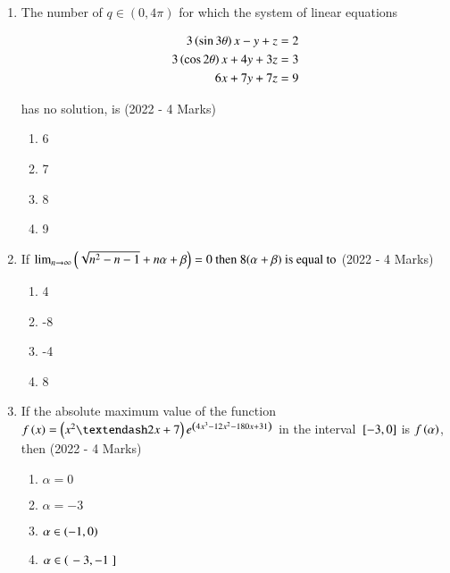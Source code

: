 \documentclass[journal]{IEEEtran}
\begin{document}
\begin{enumerate}
{        }
    \item{
     
            The number of $q \in (0, 4\pi)$ for which the system of linear equations
            
            \begin{align*}
            	3\left(\sin 3\theta\right) x - y + z &= 2 \\
            	3\left(\cos 2\theta\right) x + 4y + 3z &= 3 \\
            	6x + 7y + 7z &= 9
            \end{align*}
            
            has no solution, is \text{ }
            \hfill
            {(2022 - 4 Marks)}
            \begin{multicols}{4}
                \begin{enumerate}
                	\item 6
                	\item 7
                	\item 8
                	\item 9
                \end{enumerate}
            \end{multicols}
        
        }
    \item{
            If  $\lim_{n\rightarrow\infty}\left(\sqrt{n^2-n-1}+n\alpha+\beta\right)=0 \text{ then } 8(\alpha + \beta) \text{ is equal to}$
           	\hfill
                {(2022 - 4 Marks)}
            
           \begin{multicols}{4}
            	\begin{enumerate}
            		\item 4
            		\item -8
            		\item -4
            		\item 8
            	\end{enumerate}
            \end{multicols}
        
        }
 	\item{
        	If the absolute maximum value of the function $f\brak{x} = \brak{x^2 – 2x + 7} e^{\brak{4x^3-12x^2-180x + 31}}$ in the interval ${}\left[-3, 0\right]$ is $f\left(\alpha\right)$, then
        	\hfill
        	{(2022 - 4 Marks)}
        	
        	\begin{multicols}{4}
        		\begin{enumerate}
        			\item $\alpha = 0$
        			\item $\alpha = -3$
        			\item $\alpha \in \left(-1, 0\right)$
        			\item $\alpha \in \left(\right.-3, -1{}\left.\right]$
        		\end{enumerate}
        	\end{multicols}
        	
}
\end{enumerate}
\end{document}

